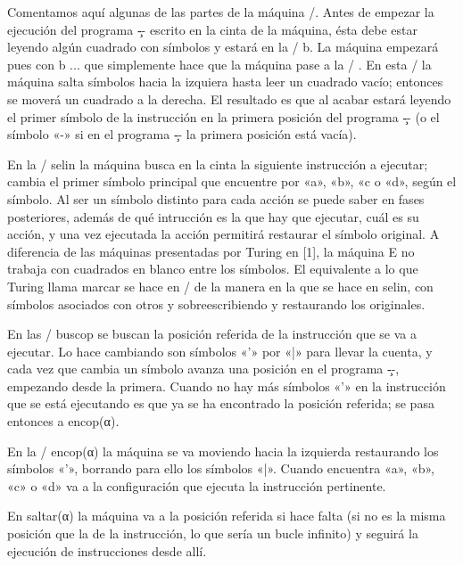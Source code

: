  Comentamos aquí algunas de las partes de la máquina \E/. Antes de empezar
la ejecución del programa \c-- escrito en la cinta de la máquina, ésta debe estar leyendo algún
cuadrado con símbolos y estará en la \configuration/ {\ffraktur b}. La máquina empezará pues con
\encaje
{\mconfig b}    {\fcode...}    {}
\finencaje
que simplemente hace que la máquina pase a la \configuration/ {}. En
esta \configuration/ la máquina salta símbolos hacia la izquiera hasta leer un cuadrado vacío;
entonces se moverá un cuadrado a la derecha. El resultado es que al acabar estará leyendo el primer
símbolo de la instrucción en la primera posición del programa \c-- (o el símbolo «-» si en el
programa \c-- la primera posición está vacía).

En la \configuration/ {\ffraktur selin} la máquina busca en la cinta la siguiente instrucción a
ejecutar; cambia el primer símbolo principal que encuentre por «a», «b», «c o «d», según el
símbolo. Al ser un símbolo distinto para cada acción se puede saber en fases posteriores, además de
qué intrucción es la que hay que ejecutar, cuál es su acción, y una vez ejecutada la acción
permitirá restaurar el símbolo original. A diferencia de las máquinas presentadas por Turing en [1],
la máquina {\machine E} no trabaja con cuadrados en blanco entre los símbolos. El equivalente a lo
que Turing llama marcar se hace en \E/ de la manera en la que se hace en {\ffraktur selin}, con
símbolos asociados con otros y sobreescribiendo y restaurando los originales.

En las \configuration/ {\ffraktur buscop} se buscan la posición referida de la instrucción que se va
a ejecutar. Lo hace cambiando son símbolos «'» por «|» para llevar la cuenta, y cada vez que cambia
un símbolo avanza una posición en el programa \c--, empezando desde la primera. Cuando no hay más
símbolos «'» en la instrucción que se está ejecutando es que ya se ha encontrado la posición
referida; se pasa entonces a {\ffraktur encop({\fcode α})}.

En la \configuration/ {\ffraktur encop({\fcode α})} la máquina se va moviendo hacia la izquierda
restaurando los símbolos «'», borrando para ello los símbolos «|». Cuando encuentra «a», «b», «c» o
«d» va a la configuración que ejecuta la instrucción pertinente.

En {\ffraktur saltar({\fcode α})} la máquina va a la posición referida si hace falta (si no es la
misma posición que la de la instrucción, lo que sería un bucle infinito) y seguirá la ejecución de
instrucciones desde allí.

